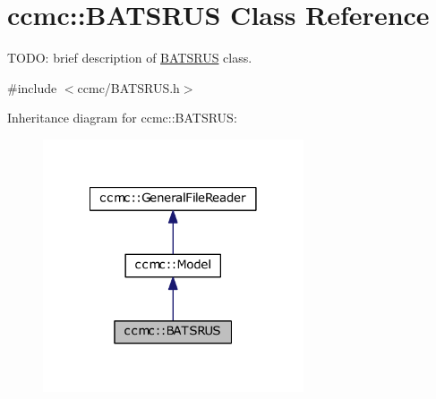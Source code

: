 \hypertarget{classccmc_1_1_b_a_t_s_r_u_s}{\section{ccmc\-:\-:B\-A\-T\-S\-R\-U\-S Class Reference}
\label{classccmc_1_1_b_a_t_s_r_u_s}
}


T\-O\-D\-O\-: brief description of \hyperlink{classccmc_1_1_b_a_t_s_r_u_s}{B\-A\-T\-S\-R\-U\-S} class.  




{\ttfamily \#include $<$ccmc/\-B\-A\-T\-S\-R\-U\-S.\-h$>$}



Inheritance diagram for ccmc\-:\-:B\-A\-T\-S\-R\-U\-S\-:\nopagebreak
\begin{figure}[H]
\begin{center}
\leavevmode
\includegraphics[width=218pt]{classccmc_1_1_b_a_t_s_r_u_s__inherit__graph}
\end{center}
\end{figure}


